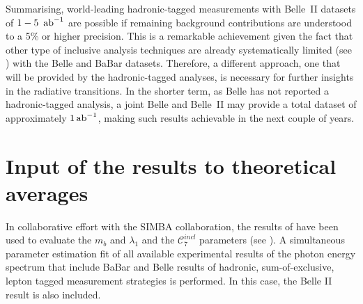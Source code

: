 Summarising, world-leading hadronic-tagged \BtoXsgamma measurements with Belle~II datasets of $1-5~\mbox{\,ab}^{-1}$ are possible if remaining background contributions are understood to a 5\% or higher precision.
This is a remarkable achievement given the fact that other type of inclusive \BtoXsgamma analysis techniques are already systematically limited (see ) with the Belle and BaBar datasets.
Therefore, a different approach, one that will be provided by the hadronic-tagged analyses, is necessary for further insights in the radiative \BtoXsgamma transitions.
In the shorter term, as Belle has not reported a hadronic-tagged \BtoXsgamma analysis, a joint Belle and Belle~II may provide a total dataset of approximately $1\mbox{\,ab}^{-1}$, making such results achievable in the next couple of years.

\section{Input of the results to theoretical averages}\label{sec:input_to_theory}

In collaborative effort with the SIMBA collaboration, the results of 
have been used to evaluate the $m_b$ and $\lambda_1$ and the $\mathcal{C}_7^{incl}$ parameters (see ). 
A simultaneous parameter estimation fit of all available experimental results of the photon energy spectrum that include
BaBar and Belle results of hadronic, sum-of-exclusive, lepton tagged measurement strategies is performed.
In this case, the Belle II result is also included.

